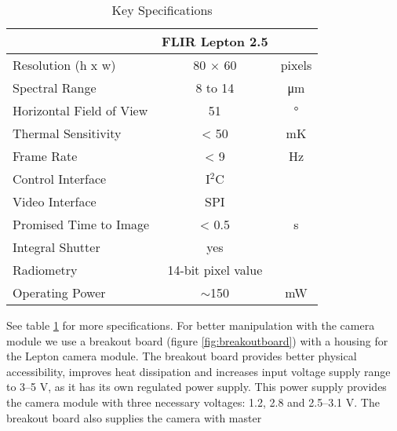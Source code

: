 \begin{table}[htb]
    \centering
    \caption{Key Specifications}
    \label{tab:thcamspecifications}
    \begin{tabular}{l c c}
        \hline
                                                            &   FLIR Lepton 2.5 	&          	\\
        \hline
        \rowcolor{aliceblue!85} Resolution (h x w)	       	&   80 $\times$ 60  	&	pixels	\\
        Spectral Range	                                    	&   8  to 14        	&	\si{\micro\meter}	\\
        \rowcolor{aliceblue!85} Horizontal Field of View		&   51              	&   \si{\degree}			\\
        Thermal Sensitivity	                                	&   < 50            	&   \si{\milli\kelvin}	\\
        \rowcolor{aliceblue!85} Frame Rate	                	&   < 9             	&   \si{\hertz} 			\\
        Control Interface	                                	&   I$^{2}$C        	&               			\\
        \rowcolor{aliceblue!85} Video Interface	            	&   SPI             	&               			\\
        Promised Time to Image	                            	&   < 0.5           	&   \si{\second}    		\\
        \rowcolor{aliceblue!85} Integral Shutter		    		&   yes             	&   			\\
        Radiometry	                                        	&   14-bit pixel value  	&       \\
        \rowcolor{aliceblue!85} Operating Power             	&	$\sim$150       	&   \si{\milli\watt} 	\\
        \hline
\end{tabular}
\end{table}
%
\linebreak See table \ref{tab:thcamspecifications} for more specifications. For better
manipulation with the camera module we use a breakout board (figure \ref{fig:breakoutboard}) with a
housing for the Lepton camera module. The breakout board provides better
physical accessibility, improves heat dissipation and increases input voltage
supply range to 3--5 \si{\volt}, as it has its own regulated power supply. This
power supply provides the camera module with three necessary voltages: 1.2, 2.8
and 2.5--3.1 \si{\volt}. The breakout board also supplies the camera with master
